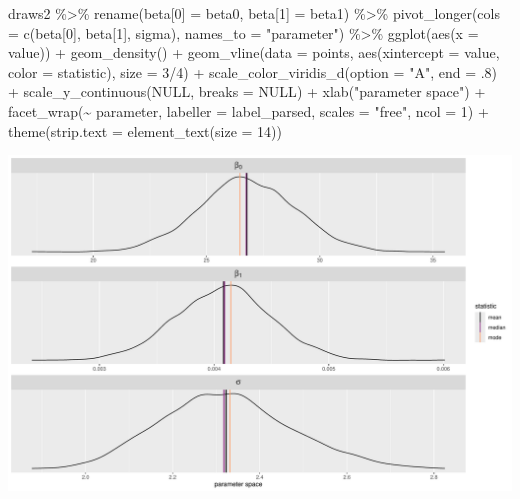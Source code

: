\documentclass[
  letterpaper,
  DIV=11,
  numbers=noendperiod]{scrartcl}
\newenvironment{Shaded}{\begin{snugshade}}{\end{snugshade}}
\newcommand{\AttributeTok}[1]{\textcolor[rgb]{0.40,0.45,0.13}{#1}}
\newcommand{\ConstantTok}[1]{\textcolor[rgb]{0.56,0.35,0.01}{#1}}
\newcommand{\DecValTok}[1]{\textcolor[rgb]{0.68,0.00,0.00}{#1}}
\newcommand{\FunctionTok}[1]{\textcolor[rgb]{0.28,0.35,0.67}{#1}}
\newcommand{\NormalTok}[1]{\textcolor[rgb]{0.00,0.23,0.31}{#1}}
\newcommand{\OtherTok}[1]{\textcolor[rgb]{0.00,0.23,0.31}{#1}}
\newcommand{\SpecialCharTok}[1]{\textcolor[rgb]{0.37,0.37,0.37}{#1}}
\newcommand{\StringTok}[1]{\textcolor[rgb]{0.13,0.47,0.30}{#1}}
\begin{document}
\begin{Shaded}
\begin{Highlighting}[]
\NormalTok{draws2 }\SpecialCharTok{\%\textgreater{}\%} 
  \FunctionTok{rename}\NormalTok{(}\StringTok{\textasciigrave{}}\AttributeTok{beta[0]}\StringTok{\textasciigrave{}} \OtherTok{=}\NormalTok{ beta0,}
         \StringTok{\textasciigrave{}}\AttributeTok{beta[1]}\StringTok{\textasciigrave{}} \OtherTok{=}\NormalTok{ beta1) }\SpecialCharTok{\%\textgreater{}\%} 
  \FunctionTok{pivot\_longer}\NormalTok{(}\AttributeTok{cols =} \FunctionTok{c}\NormalTok{(}\StringTok{\textasciigrave{}}\AttributeTok{beta[0]}\StringTok{\textasciigrave{}}\NormalTok{, }\StringTok{\textasciigrave{}}\AttributeTok{beta[1]}\StringTok{\textasciigrave{}}\NormalTok{, sigma), }
               \AttributeTok{names\_to =} \StringTok{"parameter"}\NormalTok{) }\SpecialCharTok{\%\textgreater{}\%} 
  \FunctionTok{ggplot}\NormalTok{(}\FunctionTok{aes}\NormalTok{(}\AttributeTok{x =}\NormalTok{ value)) }\SpecialCharTok{+}
  \FunctionTok{geom\_density}\NormalTok{() }\SpecialCharTok{+}
  \FunctionTok{geom\_vline}\NormalTok{(}\AttributeTok{data =}\NormalTok{ points,}
             \FunctionTok{aes}\NormalTok{(}\AttributeTok{xintercept =}\NormalTok{ value, }\AttributeTok{color =}\NormalTok{ statistic),}
             \AttributeTok{size =} \DecValTok{3}\SpecialCharTok{/}\DecValTok{4}\NormalTok{) }\SpecialCharTok{+}
  \FunctionTok{scale\_color\_viridis\_d}\NormalTok{(}\AttributeTok{option =} \StringTok{"A"}\NormalTok{, }\AttributeTok{end =}\NormalTok{ .}\DecValTok{8}\NormalTok{) }\SpecialCharTok{+}
  \FunctionTok{scale\_y\_continuous}\NormalTok{(}\ConstantTok{NULL}\NormalTok{, }\AttributeTok{breaks =} \ConstantTok{NULL}\NormalTok{) }\SpecialCharTok{+}
  \FunctionTok{xlab}\NormalTok{(}\StringTok{"parameter space"}\NormalTok{) }\SpecialCharTok{+}
  \FunctionTok{facet\_wrap}\NormalTok{(}\SpecialCharTok{\textasciitilde{}}\NormalTok{ parameter, }\AttributeTok{labeller =}\NormalTok{ label\_parsed, }\AttributeTok{scales =} \StringTok{"free"}\NormalTok{, }\AttributeTok{ncol =} \DecValTok{1}\NormalTok{) }\SpecialCharTok{+}
  \FunctionTok{theme}\NormalTok{(}\AttributeTok{strip.text =} \FunctionTok{element\_text}\NormalTok{(}\AttributeTok{size =} \DecValTok{14}\NormalTok{))}
\end{Highlighting}
\end{Shaded}

\includegraphics{Bayes_Lab_1_files/figure-pdf/unnamed-chunk-60-2.pdf}
\end{document}
